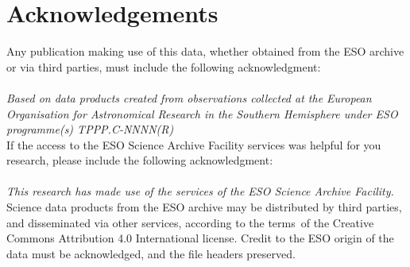 \documentclass[a4paper,10pt]{article}
\begin{document}
\section{Acknowledgements}



Any publication making use of this data, whether obtained from the ESO archive or via third parties, must include the following acknowledgment:
~\\
~\\
\noindent
\textit{Based on data products created from observations collected at the European Organisation for Astronomical Research in the Southern Hemisphere under ESO programme(s) TPPP.C-NNNN(R)}
~\\

\noindent
If the access to the ESO Science Archive Facility services was helpful for you research, please include the following acknowledgment:
~\\
~\\
\noindent
\textit{This research has made use of the services of the ESO Science Archive Facility.}
~\\

\noindent
Science data products from the ESO archive may be distributed by third parties, and disseminated via other services, according to the terms of the Creative Commons Attribution 4.0 International license. Credit to the ESO origin of the data must be acknowledged, and the file headers preserved.
\end{document}
